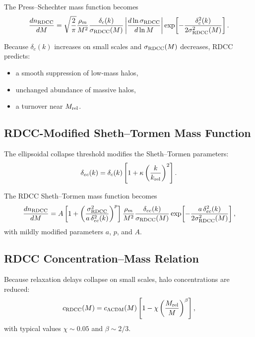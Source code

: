 \documentclass[11pt,a4paper]{article}
\begin{document}
The Press–Schechter mass function becomes
\begin{equation}
\frac{dn_{\rm RDCC}}{dM}
= \sqrt{\frac{2}{\pi}}
\frac{\rho_m}{M^2}
\frac{\delta_c(k)}{\sigma_{\rm RDCC}(M)}
\left|\frac{d\ln\sigma_{\rm RDCC}}{d\ln M}\right|
\exp\!\left[
-\frac{\delta_c^2(k)}{2\sigma_{\rm RDCC}^2(M)}
\right].
\end{equation}

Because $\delta_c(k)$ increases on small scales and $\sigma_{\rm RDCC}(M)$ decreases,
RDCC predicts:
\begin{itemize}
\item a smooth suppression of low-mass halos,
\item unchanged abundance of massive halos,
\item a turnover near $M_{\rm rel}$.
\end{itemize}

\subsection{RDCC-Modified Sheth–Tormen Mass Function}

The ellipsoidal collapse threshold modifies the Sheth–Tormen parameters:
\begin{equation}
\delta_{ec}(k)
= \delta_c(k)\left[1 + \kappa\left(\frac{k}{k_{\rm rel}}\right)^2\right].
\end{equation}

The RDCC Sheth–Tormen mass function becomes
\begin{equation}
\frac{dn_{\rm RDCC}}{dM}
= A\left[
1 + \left(\frac{\sigma_{\rm RDCC}^2}{a\,\delta_{ec}^2(k)}\right)^p
\right]
\frac{\rho_m}{M^2}
\frac{\delta_{ec}(k)}{\sigma_{\rm RDCC}(M)}
\exp\!\left[
-\frac{a\,\delta_{ec}^2(k)}{2\sigma_{\rm RDCC}^2(M)}
\right],
\end{equation}
with mildly modified parameters $a$, $p$, and $A$.

\subsection{RDCC Concentration–Mass Relation}

Because relaxation delays collapse on small scales, halo concentrations are reduced:
\begin{equation}
c_{\rm RDCC}(M)
= c_{\Lambda{\rm CDM}}(M)
\left[
1 - \chi\left(\frac{M_{\rm rel}}{M}\right)^{\beta}
\right],
\end{equation}
with typical values $\chi \sim 0.05$ and $\beta \sim 2/3$.
\end{document}
